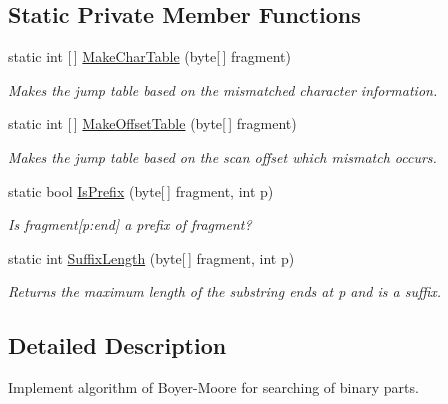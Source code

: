 \subsection*{Static Private Member Functions}
\begin{DoxyCompactItemize}
\item 
static int \mbox{[}$\,$\mbox{]} \mbox{\hyperlink{class_uniform_data_operator_1_1_binary_1_1_boyer_moore_aaf7372d00d5026e3b25a6545a7e65709}{Make\+Char\+Table}} (byte\mbox{[}$\,$\mbox{]} fragment)
\begin{DoxyCompactList}\small\item\em Makes the jump table based on the mismatched character information. \end{DoxyCompactList}\item 
static int \mbox{[}$\,$\mbox{]} \mbox{\hyperlink{class_uniform_data_operator_1_1_binary_1_1_boyer_moore_a99ef34f3b467801db8f93ef7f584fd63}{Make\+Offset\+Table}} (byte\mbox{[}$\,$\mbox{]} fragment)
\begin{DoxyCompactList}\small\item\em Makes the jump table based on the scan offset which mismatch occurs. \end{DoxyCompactList}\item 
static bool \mbox{\hyperlink{class_uniform_data_operator_1_1_binary_1_1_boyer_moore_ae65dcc0297e2910d1dd1c6efcc18f015}{Is\+Prefix}} (byte\mbox{[}$\,$\mbox{]} fragment, int p)
\begin{DoxyCompactList}\small\item\em Is fragment\mbox{[}p\+:end\mbox{]} a prefix of fragment? \end{DoxyCompactList}\item 
static int \mbox{\hyperlink{class_uniform_data_operator_1_1_binary_1_1_boyer_moore_afc33837427631cdffa540614247e4ffc}{Suffix\+Length}} (byte\mbox{[}$\,$\mbox{]} fragment, int p)
\begin{DoxyCompactList}\small\item\em Returns the maximum length of the substring ends at p and is a suffix. \end{DoxyCompactList}\end{DoxyCompactItemize}


\subsection{Detailed Description}
Implement algorithm of Boyer-\/\+Moore for searching of binary parts. 



